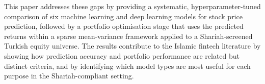 This paper addresses these gaps by providing a systematic, hyperparameter-tuned
comparison of six machine learning and deep learning models for stock price
prediction, followed by a portfolio optimisation stage that uses the predicted
returns within a sparse mean-variance framework applied to a Shariah-screened
Turkish equity universe. The results contribute to the Islamic fintech literature
by showing how prediction accuracy and portfolio performance are related but
distinct criteria, and by identifying which model types are most useful for
each purpose in the Shariah-compliant setting.